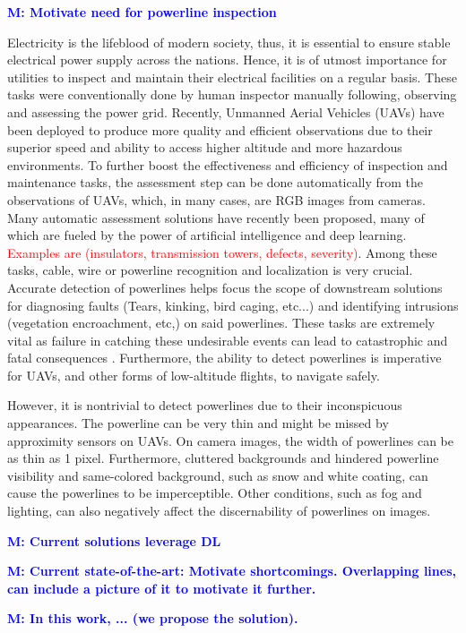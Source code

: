 \documentclass[journal]{IEEEtran}
\newcommand{\commentM}[1]{\textbf{\textcolor{blue}{M: #1}}}
\begin{document}
\commentM{Motivate need for powerline inspection}

Electricity is the lifeblood of modern society, thus, it is essential to ensure stable electrical power supply across the nations. Hence, it is of utmost importance for utilities to inspect and maintain their electrical facilities on a regular basis. These tasks were conventionally done by human inspector manually following, observing and assessing the power grid. Recently, Unmanned Aerial
Vehicles (UAVs) have been deployed to produce more quality and efficient observations due to their superior speed and ability to access higher altitude and more hazardous environments. To further boost the effectiveness and efficiency of inspection and maintenance tasks, the assessment step can be done automatically from the observations of UAVs, which, in many cases, are RGB images from cameras. Many automatic assessment solutions have recently been proposed, many of which are fueled by the power of artificial intelligence and deep learning. \textcolor{red}{Examples are (insulators, transmission towers, defects, severity)}. Among these tasks, cable, wire or powerline recognition and localization is very crucial. Accurate detection of powerlines helps focus the scope of downstream solutions for diagnosing faults (Tears, kinking, bird caging, etc...) and identifying intrusions (vegetation encroachment, etc,) on said powerlines. These tasks are extremely vital as failure in catching these undesirable events can lead to catastrophic and fatal consequences \cite{pge_bankruptcy}. Furthermore, the ability to detect powerlines is imperative for UAVs, and other forms of low-altitude flights, to navigate safely.

However, it is nontrivial to detect powerlines due to their inconspicuous appearances. The powerline can be very thin and might be missed by approximity sensors on UAVs. On camera images, the width of powerlines can be as thin as 1 pixel. Furthermore, cluttered backgrounds and hindered powerline visibility and same-colored background, such as snow and white coating, can cause the powerlines to be imperceptible. Other conditions, such as fog and lighting, can also negatively affect the discernability of powerlines on images. 

\commentM{Current solutions leverage DL}

\commentM{Current state-of-the-art: Motivate shortcomings. Overlapping lines, can include a picture of it to motivate it further.}

\commentM{In this work, ... (we propose the solution).}
\end{document}
